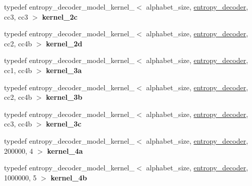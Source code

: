 \begin{DoxyCompactItemize}
\item 
\hypertarget{classdlib_1_1entropy__decoder__model_a780b5fd2fd269af6308e69dbab9a6c43}{
typedef entropy\_\-decoder\_\-model\_\-kernel\_$<$ alphabet\_\-size, \hyperlink{classdlib_1_1entropy__decoder}{entropy\_\-decoder}, cc3, cc3 $>$ {\bfseries kernel\_\-2c}}
\label{classdlib_1_1entropy__decoder__model_a780b5fd2fd269af6308e69dbab9a6c43}

\item 
\hypertarget{classdlib_1_1entropy__decoder__model_a96c64b6c563ba5520680ceb31af1d1a7}{
typedef entropy\_\-decoder\_\-model\_\-kernel\_$<$ alphabet\_\-size, \hyperlink{classdlib_1_1entropy__decoder}{entropy\_\-decoder}, cc2, cc4b $>$ {\bfseries kernel\_\-2d}}
\label{classdlib_1_1entropy__decoder__model_a96c64b6c563ba5520680ceb31af1d1a7}

\item 
\hypertarget{classdlib_1_1entropy__decoder__model_afeb314a8bf069c2a8fb0518b1e00a635}{
typedef entropy\_\-decoder\_\-model\_\-kernel\_$<$ alphabet\_\-size, \hyperlink{classdlib_1_1entropy__decoder}{entropy\_\-decoder}, cc1, cc4b $>$ {\bfseries kernel\_\-3a}}
\label{classdlib_1_1entropy__decoder__model_afeb314a8bf069c2a8fb0518b1e00a635}

\item 
\hypertarget{classdlib_1_1entropy__decoder__model_a3f9cb0b1f6fc5ee461c6afabb9687635}{
typedef entropy\_\-decoder\_\-model\_\-kernel\_$<$ alphabet\_\-size, \hyperlink{classdlib_1_1entropy__decoder}{entropy\_\-decoder}, cc2, cc4b $>$ {\bfseries kernel\_\-3b}}
\label{classdlib_1_1entropy__decoder__model_a3f9cb0b1f6fc5ee461c6afabb9687635}

\item 
\hypertarget{classdlib_1_1entropy__decoder__model_aa370da51f4d116b84925e26614edbcce}{
typedef entropy\_\-decoder\_\-model\_\-kernel\_$<$ alphabet\_\-size, \hyperlink{classdlib_1_1entropy__decoder}{entropy\_\-decoder}, cc3, cc4b $>$ {\bfseries kernel\_\-3c}}
\label{classdlib_1_1entropy__decoder__model_aa370da51f4d116b84925e26614edbcce}

\item 
\hypertarget{classdlib_1_1entropy__decoder__model_af88608a41e688b008ef899c8b58824fc}{
typedef entropy\_\-decoder\_\-model\_\-kernel\_$<$ alphabet\_\-size, \hyperlink{classdlib_1_1entropy__decoder}{entropy\_\-decoder}, 200000, 4 $>$ {\bfseries kernel\_\-4a}}
\label{classdlib_1_1entropy__decoder__model_af88608a41e688b008ef899c8b58824fc}

\item 
\hypertarget{classdlib_1_1entropy__decoder__model_accc6eaa778f23bfc9973cdfc20196c13}{
typedef entropy\_\-decoder\_\-model\_\-kernel\_$<$ alphabet\_\-size, \hyperlink{classdlib_1_1entropy__decoder}{entropy\_\-decoder}, 1000000, 5 $>$ {\bfseries kernel\_\-4b}}
\label{classdlib_1_1entropy__decoder__model_accc6eaa778f23bfc9973cdfc20196c13}


\end{DoxyCompactItemize}
